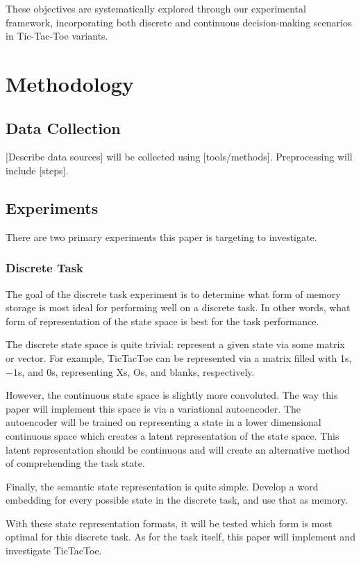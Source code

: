 \documentclass[11pt]{article}
\begin{document}
These objectives are systematically explored through our experimental framework, incorporating both discrete and continuous decision-making scenarios in Tic-Tac-Toe variants.

\section{Methodology}
\subsection{Data Collection}
[Describe data sources] will be collected using [tools/methods]. Preprocessing will include [steps].

\subsection{Experiments}
There are two primary experiments this paper is targeting to investigate.
\subsubsection{Discrete Task}
The goal of the discrete task experiment is to determine what form of memory storage is most ideal for performing well on a discrete task. In other words, what form of representation of the state space is best for the task performance.

The discrete state space is quite trivial: represent a given state via some matrix or vector. For example, TicTacToe can be represented via a matrix filled with 1s, $-1$s, and 0s, representing Xs, Os, and blanks, respectively.

However, the continuous state space is slightly more convoluted. The way this paper will implement this space is via a variational autoencoder. The autoencoder will be trained on representing a state in a lower dimensional continuous space which creates a latent representation of the state space. This latent representation should be continuous and will create an alternative method of comprehending the task state.

Finally, the semantic state representation is quite simple. Develop a word embedding for every possible state in the discrete task, and use that as memory.

With these state representation formats, it will be tested which form is most optimal for this discrete task. As for the task itself, this paper will implement and investigate TicTacToe.
\end{document}
